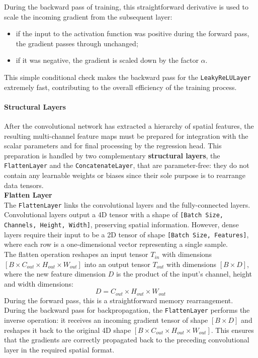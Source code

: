 During the backward pass of training, this straightforward derivative is used to scale the incoming gradient from the subsequent layer:
\begin{itemize}
    \item[-] if the input to the activation function was positive during the forward pass, the gradient passes through unchanged;
    \item[-] if it was negative, the gradient is scaled down by the factor $\alpha$.
\end{itemize}
This simple conditional check makes the backward pass for the \texttt{LeakyReLULayer} extremely fast, contributing to the overall efficiency of the training process.

\paragraph{Structural Layers}
\label{sec:03_struct_layer}

After the convolutional network has extracted a hierarchy of spatial features, the resulting multi-channel feature maps must be prepared for integration with the scalar parameters and for final processing by the regression head. This preparation is handled by two complementary \textbf{structural layers}, the \texttt{FlattenLayer} and the \texttt{ConcatenateLayer}, that are parameter-free: they do not contain any learnable weights or biases since their sole purpose is to rearrange data tensors.\\

\textbf{Flatten Layer}\\

The \texttt{FlattenLayer} links the convolutional layers and the fully-connected layers. Convolutional layers output a 4D tensor with a shape of \texttt{[Batch Size, Channels, Height, Width]}, preserving spatial information. However, dense layers require their input to be a 2D tensor of shape \texttt{[Batch Size, Features]}, where each row is a one-dimensional vector representing a single sample.\\

The flatten operation reshapes an input tensor $T_{in}$ with dimensions $[B\times C_{out}\times H_{out}\times W_{out}]$ into an output tensor $T_{out}$ with dimensions $[B\times D]$, where the new feature dimension $D$ is the product of the input's channel, height and width dimensions:
\begin{equation}
    D=C_{out}\times H_{out}\times W_{out}
\end{equation}
During the forward pass, this is a straightforward memory rearrangement.\\
During  the backward pass for backpropagation, the \texttt{FlattenLayer} performs the inverse operation: it receives an incoming gradient tensor of shape $[B\times D]$ and reshapes it back to the original 4D shape $[B\times C_{out}\times H_{out}\times W_{out}]$. This ensures that the gradients are correctly propagated back to the preceding convolutional layer in the required spatial format.\\

